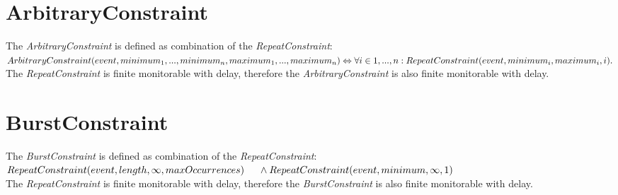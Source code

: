 \section{ArbitraryConstraint}
	The \emph{ArbitraryConstraint} is defined as combination of the \emph{RepeatConstraint}:\\[10pt]
	\begin{math}
		ArbitraryConstraint(event, minimum_1, ..., minimum_n, maximum_1, ..., maximum_n)\\
		\Leftrightarrow \forall i\in{1, ..., n}: RepeatConstraint(event, minimum_i, maximum_i, i).
	\end{math}\\[10pt]
	The \emph{RepeatConstraint} is finite monitorable with delay, therefore the \emph{ArbitraryConstraint} is also finite monitorable with delay.
	
\section{BurstConstraint}
	The \emph{BurstConstraint} is defined as combination of the \emph{RepeatConstraint}:\\[10pt]
	\begin{math}
		RepeatConstraint(event, length, \infty, maxOccurrences)\\
		\text{\hspace{.5cm}}\land RepeatConstraint(event, minimum, \infty, 1)
	\end{math}\\[10pt]
	The \emph{RepeatConstraint} is finite monitorable with delay, therefore the \emph{BurstConstraint} is also finite monitorable with delay.
	
